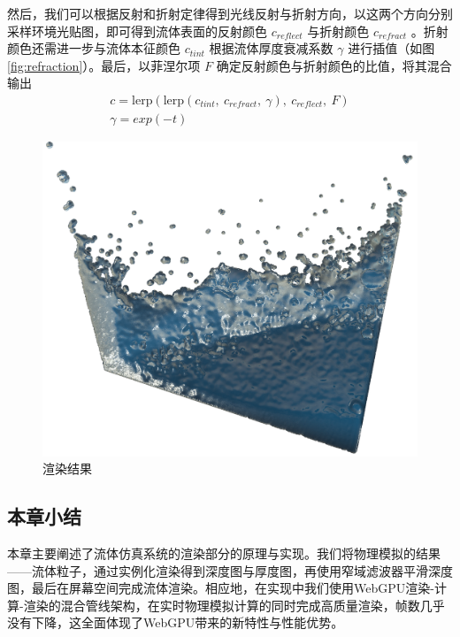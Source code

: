     然后，我们可以根据反射和折射定律得到光线反射与折射方向，以这两个方向分别采样环境光贴图，即可得到流体表面的反射颜色 $c_{reflect}$ 与折射颜色 $c_{refract}$ 。折射颜色还需进一步与流体本征颜色 $c_{tint}$ 根据流体厚度衰减系数 $\gamma$ 进行插值（如图\ref{fig:refraction}）。最后，以菲涅尔项 $F$ 确定反射颜色与折射颜色的比值，将其混合输出
    \begin{equation}
    	\begin{gathered}
    	c = \mathrm{lerp} ( \mathrm{lerp} (c_{tint},\ c_{refract},\ \gamma),\ c_{reflect},\ F ) 
    	\\
    	\gamma = exp(-t)
    	\end{gathered}
    \end{equation}
    
    \begin{figure}[htbp]
    	\centering
    	\includegraphics[width=.6\textwidth]{figures/rendering/result.png}
    	\caption{渲染结果}
    \end{figure}

\subsection{本章小结}
本章主要阐述了流体仿真系统的渲染部分的原理与实现。我们将物理模拟的结果——流体粒子，通过实例化渲染得到深度图与厚度图，再使用窄域滤波器平滑深度图，最后在屏幕空间完成流体渲染。相应地，在实现中我们使用WebGPU渲染-计算-渲染的混合管线架构，在实时物理模拟计算的同时完成高质量渲染，帧数几乎没有下降，这全面体现了WebGPU带来的新特性与性能优势。